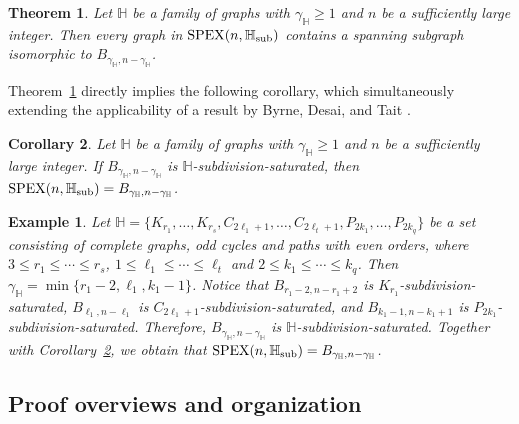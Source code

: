 \documentclass[11pt, a4paper]{article}
\newtheorem{theorem}{Theorem}[section]
\newtheorem{corollary}[theorem]{Corollary}
\newtheorem{example}{Example}[section]
\theoremstyle{definition}
\newcommand{\<}{\subseteq}
\begin{document}
\begin{theorem}\label{thm1.3}
    Let $\mathbb{H}$ be a family of graphs with $\gamma_{\mathbb{H}}\geq 1$ and $n$ be a sufficiently large integer. Then  every graph in ${\rm SPEX}(n,\mathbb{H}_{\rm sub})$ contains a spanning subgraph isomorphic to $B_{\gamma_\mathbb{H},n-\gamma_\mathbb{H}}$.
\end{theorem}
Theorem~\ref{thm1.3} directly implies the following corollary, which  simultaneously extending the applicability of a result by Byrne, Desai, and Tait \cite{byrne2024general}. %
\begin{corollary}\label{cor1}
    Let $\mathbb{H}$ be a family of graphs with $\gamma_{\mathbb{H}}\geq 1$ and $n$ be a sufficiently large integer.  If $B_{\gamma_\mathbb{H},n-\gamma_\mathbb{H}}$ is $\mathbb{H}$-subdivision-saturated,  then ${\rm SPEX}(n, \mathbb{H}_{\rm sub}) = B_{\gamma_\mathbb{H},n-\gamma_\mathbb{H}}$.
\end{corollary}
\begin{example}
    {\rm Let $\mathbb{H}=\{K_{r_1},\ldots, K_{r_s},C_{2\ell_1+1},\ldots, C_{2\ell_t+1},P_{2k_1},\ldots,P_{2k_q}\}$ be a set consisting of complete graphs, odd cycles and paths with even orders, where $3\leq r_1\leq \cdots\leq r_s$, $1\leq \ell_1\leq\cdots\leq \ell_t$ and $2\leq k_1\leq \cdots\leq k_q$. Then $\gamma_{\mathbb{H}}=\min\{r_1-2,\ell_1,k_1-1\}$. Notice that $B_{r_1-2,n-r_1+2}$ is $K_{r_1}$-subdivision-saturated, $B_{\ell_1,n-\ell_1}$ is $C_{2\ell_1+1}$-subdivision-saturated, and $B_{k_1-1,n-k_1+1}$ is $P_{2k_1}$-subdivision-saturated. Therefore,  $B_{\gamma_\mathbb{H},n-\gamma_\mathbb{H}}$ is $\mathbb{H}$-subdivision-saturated. Together with Corollary~\ref{cor1}, we obtain that ${\rm SPEX}(n, \mathbb{H}_{\rm sub}) = B_{\gamma_\mathbb{H},n-\gamma_\mathbb{H}}$.}
\end{example}
\subsection{Proof overviews and organization}
\end{document}

